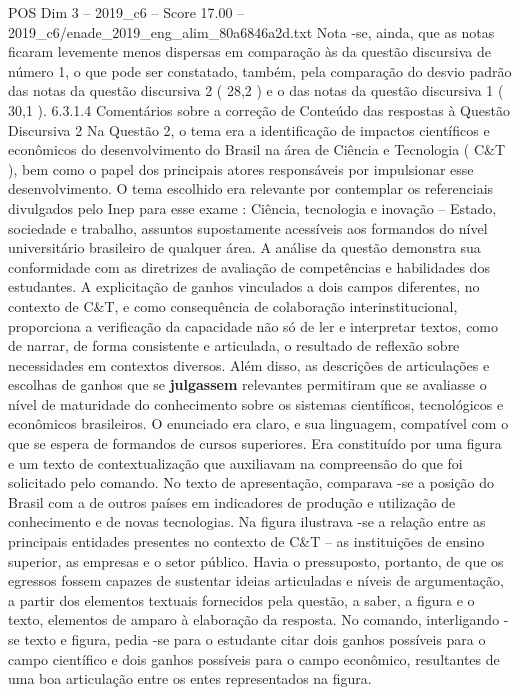 \begin{textsample}{POS Dim 3 – 2019\_c6 – Score 17.00 – 2019\_c6/enade\_2019\_eng\_alim\_80a6846a2d.txt}
Nota -se, ainda, que as notas ficaram levemente menos dispersas em comparação às da questão discursiva de número 1, o que pode ser constatado, também, pela comparação do desvio padrão das notas da questão discursiva 2 ( 28,2 ) e o das notas da questão discursiva 1 ( 30,1 ). 6.3.1.4 Comentários sobre a correção de Conteúdo das respostas à Questão Discursiva 2 Na Questão 2, o tema era a identificação de impactos científicos e econômicos do desenvolvimento do Brasil na área de Ciência e Tecnologia ( C\&T ), bem como o papel dos principais atores responsáveis por impulsionar esse desenvolvimento.
O tema escolhido era relevante por contemplar os referenciais divulgados pelo Inep para esse exame : Ciência, tecnologia e inovação – Estado, sociedade e trabalho, assuntos supostamente acessíveis aos formandos do nível universitário brasileiro de qualquer área.
A análise da questão demonstra sua conformidade com as diretrizes de avaliação de competências e habilidades dos estudantes.
A explicitação de ganhos vinculados a dois campos diferentes, no contexto de C\&T, e como consequência de colaboração interinstitucional, proporciona a verificação da capacidade não só de ler e interpretar textos, como de narrar, de forma consistente e articulada, o resultado de reflexão sobre necessidades em contextos diversos.
Além disso, as descrições de articulações e escolhas de ganhos que se \textbf{julgassem} relevantes permitiram que se avaliasse o nível de maturidade do conhecimento sobre os sistemas científicos, tecnológicos e econômicos brasileiros.
O enunciado era claro, e sua linguagem, compatível com o que se espera de formandos de cursos superiores.
Era constituído por uma figura e um texto de contextualização que auxiliavam na compreensão do que foi solicitado pelo comando.
No texto de apresentação, comparava -se a posição do Brasil com a de outros países em indicadores de produção e utilização de conhecimento e de novas tecnologias.
Na figura ilustrava -se a relação entre as principais entidades presentes no contexto de C\&T – as instituições de ensino superior, as empresas e o setor público.
Havia o pressuposto, portanto, de que os egressos fossem capazes de sustentar ideias articuladas e níveis de argumentação, a partir dos elementos textuais fornecidos pela questão, a saber, a figura e o texto, elementos de amparo à elaboração da resposta.
No comando, interligando -se texto e figura, pedia -se para o estudante citar dois ganhos possíveis para o campo científico e dois ganhos possíveis para o campo econômico, resultantes de uma boa articulação entre os entes representados na figura.

\end{textsample}
